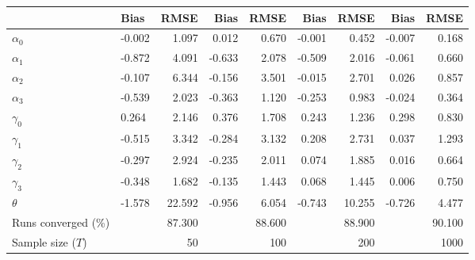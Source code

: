 
\begin{tabular}[t]{llrrrrrrr}
\toprule
  & Bias & RMSE & Bias & RMSE & Bias & RMSE & Bias & RMSE\\
\midrule
$\alpha_{0}$ & -0.002 & 1.097 & 0.012 & 0.670 & -0.001 & 0.452 & -0.007 & 0.168\\
$\alpha_{1}$ & -0.872 & 4.091 & -0.633 & 2.078 & -0.509 & 2.016 & -0.061 & 0.660\\
$\alpha_{2}$ & -0.107 & 6.344 & -0.156 & 3.501 & -0.015 & 2.701 & 0.026 & 0.857\\
$\alpha_{3}$ & -0.539 & 2.023 & -0.363 & 1.120 & -0.253 & 0.983 & -0.024 & 0.364\\
$\gamma_{0}$ & 0.264 & 2.146 & 0.376 & 1.708 & 0.243 & 1.236 & 0.298 & 0.830\\
$\gamma_{1}$ & -0.515 & 3.342 & -0.284 & 3.132 & 0.208 & 2.731 & 0.037 & 1.293\\
$\gamma_{2}$ & -0.297 & 2.924 & -0.235 & 2.011 & 0.074 & 1.885 & 0.016 & 0.664\\
$\gamma_{3}$ & -0.348 & 1.682 & -0.135 & 1.443 & 0.068 & 1.445 & 0.006 & 0.750\\
$\theta$ & -1.578 & 22.592 & -0.956 & 6.054 & -0.743 & 10.255 & -0.726 & 4.477\\
Runs converged (\%) &  & 87.300 &  & 88.600 &  & 88.900 &  & 90.100\\
Sample size ($T$) &  & 50 &  & 100 &  & 200 &  & 1000\\
\bottomrule
\end{tabular}
